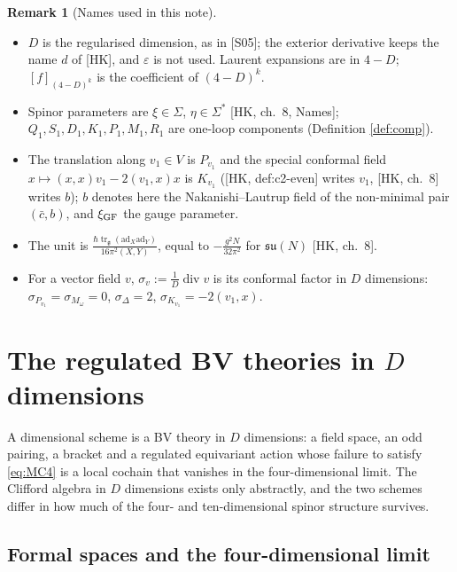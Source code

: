 \documentclass[11pt]{article}
\theoremstyle{definition}
\newtheorem{remark}[definition]{Remark}
\numberwithin{equation}{section}
\begin{document}
\begin{remark}[Names used in this note]
\label{rem:names}
\begin{itemize}
\item $D$ is the regularised dimension, as in [S05]; the exterior derivative keeps the name $d$ of [HK], and $\varepsilon$ is not used. Laurent expansions are in $4-D$; $[f]_{(4-D)^{k}}$ is the coefficient of $(4-D)^k$.
\item Spinor parameters are $\xi\in\Sigma$, $\eta\in\Sigma^*$ [HK, ch.~8, Names]; $Q_1,S_1,D_1,K_1,P_1,M_1,R_1$ are one-loop components (Definition \ref{def:comp}).
\item The translation along $v_1\in V$ is $P_{v_1}$ and the special conformal field $x\mapsto(x,x)v_1-2(v_1,x)x$ is $K_{v_1}$ ([HK, def:c2-even] writes $v_1$, [HK, ch.~8] writes $b$); $b$ denotes here the Nakanishi--Lautrup field of the non-minimal pair $(\bar c,b)$, and $\xi_{\rm GF}$ the gauge parameter.
\item The unit is $\frac{\hbar\operatorname{tr}_{\mathfrak g}(\mathrm{ad}_X\mathrm{ad}_Y)}{16\pi^2(X,Y)}$, equal to $-\frac{g^2N}{32\pi^2}$ for $\mathfrak{su}(N)$ [HK, ch.~8].
\item For a vector field $v$, $\sigma_v:=\frac1D\operatorname{div}v$ is its conformal factor in $D$ dimensions: $\sigma_{P_{v_1}}=\sigma_{M_\omega}=0$, $\sigma_\Delta=2$, $\sigma_{K_{v_1}}=-2(v_1,x)$.
\end{itemize}
\end{remark}

\section{The regulated BV theories in \texorpdfstring{$D$}{D} dimensions}
\label{sec:schemes}

A dimensional scheme is a BV theory in $D$ dimensions: a field space, an odd pairing, a bracket and a regulated equivariant action whose failure to satisfy \eqref{eq:MC4} is a local cochain that vanishes in the four-dimensional limit. The Clifford algebra in $D$ dimensions exists only abstractly, and the two schemes differ in how much of the four- and ten-dimensional spinor structure survives.

\subsection{Formal spaces and the four-dimensional limit}
\end{document}
